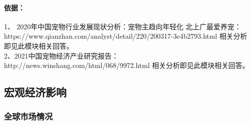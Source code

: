 \documentclass[a4paper]{ctexart}
\begin{document}
\begin{enumerate}[label=\alph*.]
  \paragraph{依据：}1、 2020年中国宠物行业发展现状分析：宠物主趋向年轻化 北上广最爱养宠：\\https://www.qianzhan.com/analyst/detail/220/200317-3e4b2793.html
  相关分析即见此模块相关回答。\\2、2021中国宠物经济产业研究报告：http://news.winshang.com/html/068/9972.html
  相关分析即见此模块相关回答。
\end{enumerate}
\subsection{宏观经济影响}
\subsubsection{全球市场情况}
\end{document}
